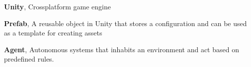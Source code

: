 \noindent
\label{itm:unity}\textbf{Unity}, Crossplatform game engine


\noindent
\label{itm:prefab}\textbf{Prefab}, A reusable object in Unity that stores a configuration and can be used as a template for creating assets

\noindent
\label{itm:agent}\textbf{Agent}, Autonomous systems that inhabits an environment and act based on predefined rules.